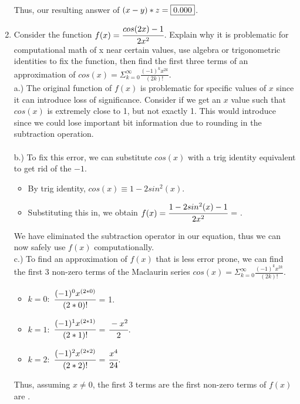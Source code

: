 \documentclass[12pt]{article}
\begin{document}
\begin{enumerate}
Thus, our resulting answer of $(x-y)*z = \fbox{0.000}$. \\

	\item Consider the function $f(x) = \cfrac{cos(2x) - 1}{2x^2}$. Explain why it is problematic for computational math of x near certain values, use algebra or trigonometric identities to fix the function, then find the first three terms of an approximation of $cos(x) = \Sigma^{\infty}_{k=0} \frac{(-1)^kx^{2k}}{(2k)!}$. \\
	
	a.) The original function of $f(x)$ is problematic for specific values of $x$ since it can introduce loss of significance. Consider if we get an $x$ value such that $cos(x)$ is extremely close to 1, but not exactly 1. This would introduce  since we could lose important bit information due to rounding in the subtraction operation. \\ \\
	b.) To fix this error, we can substitute $cos(x)$ with a trig identity equivalent to get rid of the $-1$.
	\begin{itemize}
		\item[] By trig identity, $cos(x) \equiv 1 - 2sin^2(x)$.
		\item[] Substituting this in, we obtain $f(x) = \cfrac{1-2sin^2(x) - 1}{2x^2}$ = .
	\end{itemize}

	We have eliminated the subtraction operator in our equation, thus we can now safely use $f(x)$ computationally. \\
	
	c.) To find an approximation of $f(x)$ that is less error prone, we can find the first 3 non-zero terms of the Maclaurin series $cos(x) = \Sigma^{\infty}_{k=0} \frac{(-1)^kx^{2k}}{(2k)!}$.
	\begin{itemize}
		\item[] $k=0:$ \tabto{2cm} $\cfrac{(-1)^0x^{(2*0)}}{(2*0)!}$ = 1.\\
		\item[] $k=1:$ \tabto{2cm} $\cfrac{(-1)^1x^{(2*1)}}{(2*1)!}$ = $\cfrac{-x^2}{2}$.\\
		\item[] $k=2:$ \tabto{2cm} $\cfrac{(-1)^2x^{(2*2)}}{(2*2)!}$ = $\cfrac{x^4}{24}$.
	\end{itemize}
	
	Thus, assuming $x \neq 0$, the first 3 terms are the first non-zero terms of $f(x)$ are .
	\\ \\ \\ \\ \\ \\ \\ \\ \\ \\ \\ \\ \\ \\ \\
\end{enumerate} 
\end{document}
